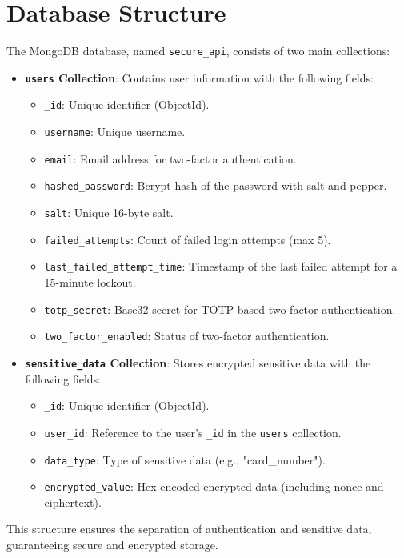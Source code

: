 \documentclass[a4paper,12pt]{article}
\begin{document}
\section{Database Structure}
The MongoDB database, named \texttt{secure\_api}, consists of two main collections:
\begin{itemize}
    \item \textbf{\texttt{users} Collection}: Contains user information with the following fields:
    \begin{itemize}
        \item \texttt{\_id}: Unique identifier (ObjectId).
        \item \texttt{username}: Unique username.
        \item \texttt{email}: Email address for two-factor authentication.
        \item \texttt{hashed\_password}: Bcrypt hash of the password with salt and pepper.
        \item \texttt{salt}: Unique 16-byte salt.
        \item \texttt{failed\_attempts}: Count of failed login attempts (max 5).
        \item \texttt{last\_failed\_attempt\_time}: Timestamp of the last failed attempt for a 15-minute lockout.
        \item \texttt{totp\_secret}: Base32 secret for TOTP-based two-factor authentication.
        \item \texttt{two\_factor\_enabled}: Status of two-factor authentication.
    \end{itemize}
    \item \textbf{\texttt{sensitive\_data} Collection}: Stores encrypted sensitive data with the following fields:
    \begin{itemize}
        \item \texttt{\_id}: Unique identifier (ObjectId).
        \item \texttt{user\_id}: Reference to the user's \texttt{\_id} in the \texttt{users} collection.
        \item \texttt{data\_type}: Type of sensitive data (e.g., "card\_number").
        \item \texttt{encrypted\_value}: Hex-encoded encrypted data (including nonce and ciphertext).
    \end{itemize}
\end{itemize}
This structure ensures the separation of authentication and sensitive data, guaranteeing secure and encrypted storage.
\end{document}
